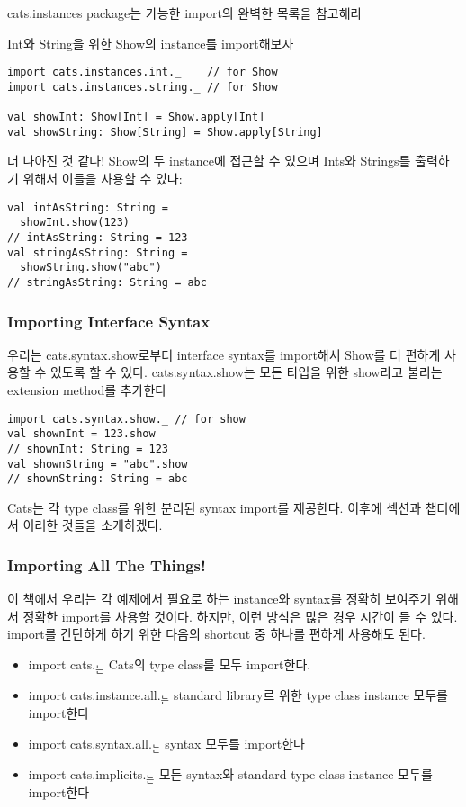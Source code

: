 \documentclass[a4paper]{article}
\begin{document}
cats.instances package는 가능한 import의 완벽한 목록을 참고해라

Int와 String을 위한 Show의 instance를 import해보자

\begin{verbatim}
import cats.instances.int._    // for Show
import cats.instances.string._ // for Show

val showInt: Show[Int] = Show.apply[Int] 
val showString: Show[String] = Show.apply[String]
\end{verbatim}

더 나아진 것 같다! Show의 두 instance에 접근할 수 있으며 Ints와 Strings를 출력하기 위해서 이들을 사용할 수 있다:

\begin{verbatim}
val intAsString: String =
  showInt.show(123)
// intAsString: String = 123
val stringAsString: String =
  showString.show("abc")
// stringAsString: String = abc
\end{verbatim}

\subsubsection{Importing Interface Syntax}
\label{sec:orgcf0fc26}
우리는 cats.syntax.show로부터 interface syntax를 import해서 Show를 더 편하게 사용할 수 있도록 할 수 있다. cats.syntax.show는 모든 타입을 위한 show라고 불리는 extension method를 추가한다

\begin{verbatim}
import cats.syntax.show._ // for show
val shownInt = 123.show
// shownInt: String = 123
val shownString = "abc".show
// shownString: String = abc
\end{verbatim}

Cats는 각 type class를 위한 분리된 syntax import를 제공한다. 이후에 섹션과 챕터에서 이러한 것들을 소개하겠다.

\subsubsection{Importing All The Things!}
\label{sec:orgb537c16}
이 책에서 우리는 각 예제에서 필요로 하는 instance와 syntax를 정확히 보여주기 위해서 정확한 import를 사용할 것이다. 하지만, 이런 방식은 많은 경우 시간이 들 수 있다. import를 간단하게 하기 위한 다음의 shortcut 중 하나를 편하게 사용해도 된다.

\begin{itemize}
\item import cats.\(_{\text{는}}\) Cats의 type class를 모두 import한다.
\item import cats.instance.all.\(_{\text{는}}\) standard library르 위한 type class instance 모두를 import한다
\item import cats.syntax.all.\(_{\text{는}}\) syntax 모두를 import한다
\item import cats.implicits.\(_{\text{는}}\) 모든 syntax와 standard type class instance 모두를 import한다
\end{itemize}
\end{document}

